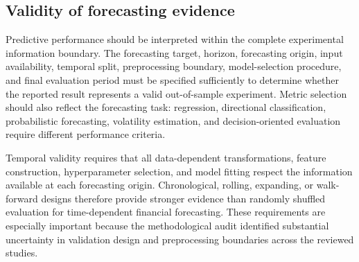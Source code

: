 \documentclass[pdflatex,sn-mathphys-num]{sn-jnl}%
\theoremstyle{thmstyleone}%
\theoremstyle{thmstyletwo}%
\theoremstyle{thmstylethree}%
\begin{document}
\subsection{Validity of forecasting evidence}

Predictive performance should be interpreted within the complete
experimental information boundary. The forecasting target, horizon,
forecasting origin, input availability, temporal split, preprocessing
boundary, model-selection procedure, and final evaluation period must be
specified sufficiently to determine whether the reported result represents
a valid out-of-sample experiment. Metric selection should also reflect the
forecasting task: regression, directional classification, probabilistic
forecasting, volatility estimation, and decision-oriented evaluation require
different performance criteria.

Temporal validity requires that all data-dependent transformations,
feature construction, hyperparameter selection, and model fitting respect
the information available at each forecasting origin. Chronological,
rolling, expanding, or walk-forward designs therefore provide stronger
evidence than randomly shuffled evaluation for time-dependent financial
forecasting. These requirements are especially important because the
methodological audit identified substantial uncertainty in validation design
and preprocessing boundaries across the reviewed studies.

\end{document}
